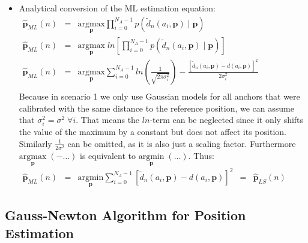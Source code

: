 \documentclass{article}
\begin{document}
\begin{itemize}
    \item Analytical conversion of the ML estimation equation:\\
    
        $\begin{array}{ccccl}
        	\hat{\mathbf{p}}_{ML}(n) & = & \underset{\mathbf{p}}{\textrm{argmax}} \displaystyle \prod_{i=0}^{N_A-1} p(\tilde{d}_n(a_i,\mathbf{p})\mid\mathbf{p}) & &\\
        	\hat{\mathbf{p}}_{ML}(n) & = & \underset{\mathbf{p}}{\textrm{argmax}} \;ln \left[ \displaystyle \prod_{i=0}^{N_A-1} p(\tilde{d}_n(a_i,\mathbf{p})\mid\mathbf{p}) \right] & &\\        
        	\hat{\mathbf{p}}_{ML}(n) & = & \underset{\mathbf{p}}{\textrm{argmax}} \displaystyle \sum_{i=0}^{N_A - 1} ln \left( \frac{1}{\sqrt{2\pi\sigma_i^2}}\right) - \frac{[\tilde{d}_n(a_i,\mathbf{p})-d(a_i,\mathbf{p})]^2}{2\sigma_i^2} & &\\
        \end{array}$ \\
       
        Because in scenario 1 we only use Gaussian models for all anchors that were calibrated with the same distance to the reference position, we can assume that $\sigma_i^2 = \sigma^2 \; \forall i$. That means the $ln$-term can be neglected since it only shifts the value of the maximum by a constant but does not affect its position. Similarly $\frac{1}{2\sigma^2}$ can be omitted, as it is also just a scaling factor. Furthermore $ \underset{\mathbf{p}}{\textrm{argmax}}\;(- \dots)$ is equivalent to $\underset{\mathbf{p}}{\textrm{argmin}}\;(\dots)$. Thus: \\
        
        $\begin{array}{ccccl}
        
        	\hat{\mathbf{p}}_{ML}(n) & = & \underset{\mathbf{p}}{\textrm{argmin}} \displaystyle \sum_{i=0}^{N_A-1} [\tilde{d}_n(a_i,\mathbf{p})-d(a_i,\mathbf{p})]^2 & = & \hat{\mathbf{p}}_{LS}(n)
        	    	
        \end{array}$
                 	
\end{itemize}



\subsection{Gauss-Newton Algorithm for Position Estimation}
\end{document}
